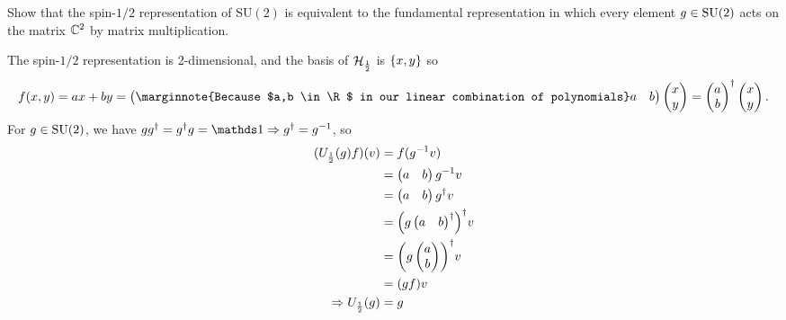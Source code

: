 \documentclass[10pt]{article}
\begin{document}
\begin{example}\label{b2e22}
	Show that the spin-$1/2$ representation of SU$(2)$ is equivalent to the fundamental representation in which every element $g \in \text{SU}(2)$ acts on the matrix $\mathbb{C}^2$ by matrix multiplication.
\end{example}
\sol The spin-$1/2$ representation is 2-dimensional, and the basis of $\mathcal{H}_\frac12$ is $\lbrace x,y\rbrace$ so
$$
f(x,y)=ax+by = \begin{pmatrix}\marginnote{Because $a,b \in \R$ in our linear combination of polynomials}
	a&b
\end{pmatrix}\begin{pmatrix}
	x\\y
\end{pmatrix} = \begin{pmatrix}
	a\\b
\end{pmatrix}^\dag\begin{pmatrix}
	x\\y
\end{pmatrix}.
$$
For $g\in\text{SU}(2)$, we have $gg^\dag=g^\dag g = \id \Rightarrow g^\dag = g^{-1}$, so
$$
\begin{aligned}
	(U_\frac12(g)f)(v) &= f(g^{-1}v)\\
	&= \begin{pmatrix}
		a&b
	\end{pmatrix}g^{-1}v\\
	&= \begin{pmatrix}
		a&b
	\end{pmatrix}g^\dag v\\
	&= \p*{g\begin{pmatrix}
		a&b
	\end{pmatrix}^\dag}^\dag v\\
	&= \p*{g\begin{pmatrix}
		a\\b
	\end{pmatrix}}^\dag v\\
	&= (gf) v\\
\Rightarrow U_\frac12(g) &= g
\end{aligned}
$$
\end{document}
